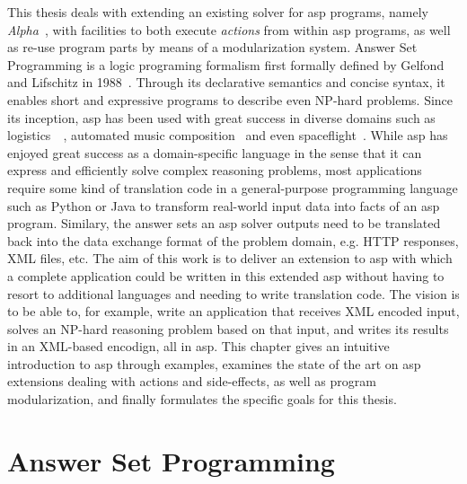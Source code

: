 This thesis deals with extending an existing solver for \gls{asp} programs, namely \emph{Alpha}~\cite{alpha}, with facilities to both execute \emph{actions} from within \gls{asp} programs, as well as re-use program parts by means of a modularization system. Answer Set Programming is a logic programing formalism first formally defined by Gelfond and Lifschitz in 1988~\cite{stable-models}. Through its declarative semantics and concise syntax, it enables short and expressive programs to describe even NP-hard problems. Since its inception, \gls{asp} has been used with great success in diverse domains such as logistics~\cite{gioia-tauro}~\cite{train-scheduling}, automated music composition~\cite{blues-composition} and even spaceflight~\cite{space-shuttle}. While \gls{asp} has enjoyed great success as a domain-specific language in the sense that it can express and efficiently solve complex reasoning problems, most applications require some kind of translation code in a general-purpose programming language such as Python or Java to transform real-world input data into facts of an \gls{asp} program. Similary, the answer sets an \gls{asp} solver outputs need to be translated back into the data exchange format of the problem domain, e.g. HTTP responses, XML files, etc. The aim of this work is to deliver an extension to \gls{asp} with which a complete application could be written in this extended \gls{asp} without having to resort to additional languages and needing to write translation code. The vision is to be able to, for example, write an application that receives XML encoded input, solves an NP-hard reasoning problem based on that input, and writes its results in an XML-based encodign, all in \gls{asp}. This chapter gives an intuitive introduction to \gls{asp} through examples, examines the state of the art on \gls{asp} extensions dealing with actions and side-effects, as well as program modularization, and finally formulates the specific goals for this thesis.

\section{Answer Set Programming}

